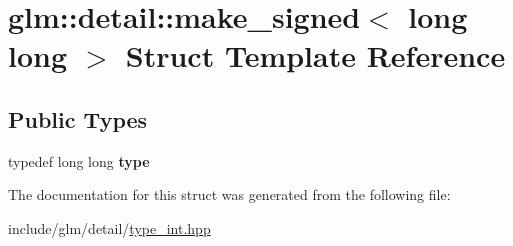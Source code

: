 \hypertarget{structglm_1_1detail_1_1make__signed_3_01long_01long_01_4}{}\section{glm\+:\+:detail\+:\+:make\+\_\+signed$<$ long long $>$ Struct Template Reference}
\label{structglm_1_1detail_1_1make__signed_3_01long_01long_01_4}
\subsection*{Public Types}
\begin{DoxyCompactItemize}
\item 
\mbox{\label{structglm_1_1detail_1_1make__signed_3_01long_01long_01_4_a109303fc9f5838a2843711c023a57bc8}} 
typedef long long {\bfseries type}
\end{DoxyCompactItemize}


The documentation for this struct was generated from the following file\+:\begin{DoxyCompactItemize}
\item 
include/glm/detail/\hyperlink{type__int_8hpp}{type\+\_\+int.\+hpp}\end{DoxyCompactItemize}
